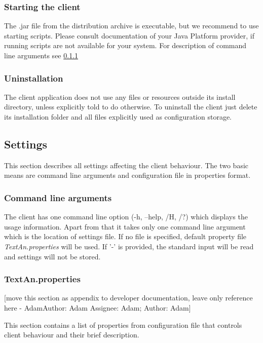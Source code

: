 \documentclass[12pt,a4paper]{report}
\makeatletter
\newcommand{\comment}[3][\@empty]{
  {\color{magenta}[#3 - }
  {\color{green}\ifx\@empty#1\relax Author: #2 \else Assignee: #1; Author: #2\fi}{\color{magenta}]}
}
\makeatother
\begin{document}
\subsubsection{Starting the client}

The .jar file from the distribution archive is executable,
but we recommend to use starting scripts.
Please consult documentation of your Java Platform provider,
if running scripts are not available for your system.
For description of command line arguments see \ref{ssec:CliCmdArg}

\subsubsection{Uninstallation}

The client application does not use any files or resources outside its install directory,
unless explicitly told to do otherwise.
To uninstall the client just delete its installation folder
and all files explicitly used as configuration storage.

\subsection{Settings}

This section describes all settings affecting the client behaviour.
The two basic means are command line arguments and configuration file in properties format.

\subsubsection{Command line arguments}
\label{ssec:CliCmdArg}

The client has one command line option (-h, --help, /H, /?) which displays the usage information.
Apart from that it takes only one command line argument which is the location of settings file.
If no file is specified, default property file \emph{TextAn.properties} will be used.
If '-' is provided, the standard input will be read and settings will not be stored.

\subsubsection{TextAn.properties}

\comment[Adam]{Adam}{move this section as appendix to developer documentation, leave only reference here}
This section contains a list of properties from configuration file that controls
client behaviour and their brief description.
\end{document}
